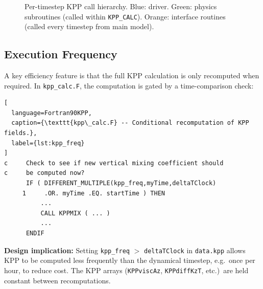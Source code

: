 \documentclass[12pt,letterpaper]{article}
\begin{document}
\begin{figure}[H]
\caption{Per-timestep KPP call hierarchy.  
  \textcolor{fortranblue}{Blue}: driver.  
  \textcolor{fortrangreen!80}{Green}: physics subroutines (called within \texttt{KPP\_CALC}).  
  \textcolor{fortranorange}{Orange}: interface routines (called every timestep from  
  main model).}  
\end{figure}  
  
\subsection{Execution Frequency}  
  
A key efficiency feature is that the full KPP calculation is only  
recomputed when required. In \texttt{kpp\_calc.F}, the computation is  
gated by a time-comparison check:  
  
\begin{lstlisting}[  
  language=Fortran90KPP,  
  caption={\texttt{kpp\_calc.F} -- Conditional recomputation of KPP fields.},  
  label={lst:kpp_freq}  
]  
c     Check to see if new vertical mixing coefficient should  
c     be computed now?  
      IF ( DIFFERENT_MULTIPLE(kpp_freq,myTime,deltaTClock)  
     1     .OR. myTime .EQ. startTime ) THEN  
          ...  
          CALL KPPMIX ( ... )  
          ...  
      ENDIF  
\end{lstlisting}  
  
\begin{infobox}  
\textbf{Design implication:} Setting \texttt{kpp\_freq} $>$ \texttt{deltaTClock}  
in \texttt{data.kpp} allows KPP to be computed less frequently than the  
dynamical timestep, e.g.\ once per hour, to reduce cost. The KPP arrays  
(\texttt{KPPviscAz}, \texttt{KPPdiffKzT}, etc.)\ are held constant  
between recomputations.  
\end{infobox}  
  
\end{document}

